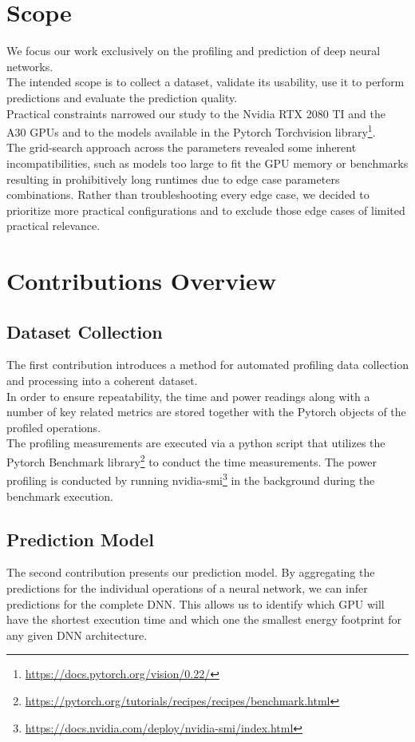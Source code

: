\section{Scope}

We focus our work exclusively on the profiling and prediction of deep neural networks. \\
The intended scope is to collect a dataset, validate its usability, use it to perform predictions and evaluate the prediction quality. \\
Practical constraints narrowed our study to the Nvidia RTX 2080 TI and the A30 GPUs and to the models available in the Pytorch Torchvision library\footnote{\url{https://docs.pytorch.org/vision/0.22/}}. \\
The grid-search approach across the parameters revealed some inherent incompatibilities, such as models too large to fit the GPU memory or benchmarks resulting in prohibitively long runtimes due to edge case parameters combinations. Rather than troubleshooting every edge case, we decided to prioritize more practical configurations and to exclude those edge cases of limited practical relevance.

\section{Contributions Overview}
\subsection{Dataset Collection}

The first contribution introduces a method for automated profiling data collection and processing into a coherent dataset.\\
In order to ensure repeatability, the time and power readings along with a number of key related metrics are stored together with the Pytorch objects of the profiled operations. \\
The profiling measurements are executed via a python script that utilizes the Pytorch Benchmark library\footnote{\url{https://pytorch.org/tutorials/recipes/recipes/benchmark.html}} to conduct the time measurements. The power profiling is conducted by running nvidia-smi\footnote{\url{https://docs.nvidia.com/deploy/nvidia-smi/index.html}} in the background during the benchmark execution. 

\subsection{Prediction Model}
The second contribution presents our prediction model. By aggregating the predictions for the individual operations of a neural network, we can infer predictions for the complete DNN. This allows us to identify which GPU will have the shortest execution time and which one the smallest energy footprint for any given DNN architecture. 

